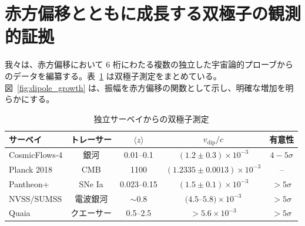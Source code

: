 \documentclass[11pt,a4paper]{article}
\begin{document}
	\section{赤方偏移とともに成長する双極子の観測的証拠}
	
	我々は、赤方偏移において 6 桁にわたる複数の独立した宇宙論的プローブからのデータを編纂する。表~\ref{tab:dipoles} は双極子測定をまとめている。図~\ref{fig:dipole_growth} は、振幅を赤方偏移の関数として示し、明確な増加を明らかにする。
	
	\begin{table}[htbp]
		\centering
		\caption{独立サーベイからの双極子測定}
		\label{tab:dipoles}
		\begin{tabular}{lcccc}
			\toprule
			\textbf{サーベイ} & \textbf{トレーサー} & \(\langle z \rangle\) & \(v_{\text{dip}}/c\) & \textbf{有意性} \\
			\midrule
			CosmicFlows-4 \cite{Watkins2023} & 銀河 & 0.01--0.1 & \((1.2 \pm 0.3) \times 10^{-3}\) & \(4-5\sigma\) \\
			Planck 2018 \cite{Planck2018VII} & CMB & 1100 & \((1.2335 \pm 0.0013) \times 10^{-3}\) & -- \\
			Pantheon+ \cite{Sah2025} & SNe Ia & 0.023--0.15 & \((1.5 \pm 0.1) \times 10^{-3}\) & \(>5\sigma\) \\
			NVSS/SUMSS \cite{Colin2017} & 電波銀河 & \(\sim0.8\) & \((4.5\)--\(5.8) \times 10^{-3}\) & \(>5\sigma\) \\
			Quaia \cite{Secrest2025} & クエーサー & 0.5--2.5 & \(>5.6 \times 10^{-3}\) & \(>5\sigma\) \\
			\bottomrule
		\end{tabular}
	\end{table}
	
\end{document}
